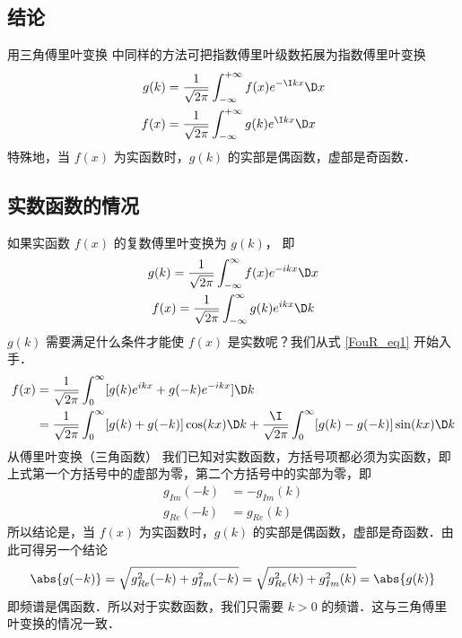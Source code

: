 
\subsection{结论}
用三角傅里叶变换  中同样的方法可把指数傅里叶级数拓展为指数傅里叶变换
\begin{align}
g(k) &= \frac{1}{\sqrt{2\pi}} \int_{-\infty}^{+\infty} f(x)e^{-\I kx} \D x \\
f(x) &= \frac{1}{\sqrt{2\pi}} \int_{-\infty}^{+\infty} g(k)e^{\I kx} \D x
\end{align}
特殊地，当 $f(x)$ 为实函数时，$g(k)$ 的实部是偶函数，虚部是奇函数．

\subsection{实数函数的情况}

如果实函数 $f(x)$ 的复数傅里叶变换为 $g(k)$， 即
\begin{gather}
g(k) = \frac{1}{\sqrt{2\pi}} \int_{-\infty}^\infty f(x)e^{-ikx} \D x\\
f(x) = \frac{1}{\sqrt{2\pi}} \int_{-\infty}^\infty g(k)e^{ikx} \D k \label{FouR_eq1}
\end{gather}
$g(k)$ 需要满足什么条件才能使 $f(x)$ 是实数呢？我们从式 \eqref{FouR_eq1} 开始入手．
\begin{equation}\begin{aligned}
f(x) &= \frac{1}{\sqrt{2\pi}} \int_0^\infty [g(k)e^{ikx} + g(-k)e^{-ikx}] \D k \\
&= \frac{1}{\sqrt{2\pi}} \int_0^\infty [g(k)+g(-k)]\cos(kx)\D k + \frac{\I}{\sqrt{2\pi}} \int_0^\infty [g(k)-g(-k)]\sin(kx) \D k
\end{aligned}\end{equation}
从傅里叶变换（三角函数）%
我们已知对实数函数，方括号项都必须为实函数，即上式第一个方括号中的虚部为零，第二个方括号中的实部为零，即
\begin{equation}\begin{aligned}
g_{Im}(-k) &= -g_{Im}(k) \\
g_{Re}(-k) &= g_{Re}(k)
\end{aligned}\end{equation}
所以结论是，当 $f(x)$ 为实函数时，$g(k)$ 的实部是偶函数，虚部是奇函数．由此可得另一个结论
\begin{equation}
\abs{g(-k)}=\sqrt{g_{Re}^2(-k)+g_{Im}^2(-k)}=\sqrt{g_{Re}^2(k)+g_{Im}^2(k)} = \abs{g(k)}
\end{equation}
即频谱是偶函数．所以对于实数函数，我们只需要 $k>0$ 的频谱．这与三角傅里叶变换的情况一致．